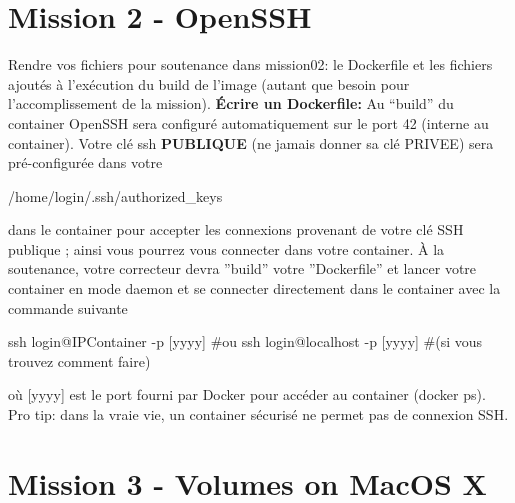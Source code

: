 \documentclass{42}
\begin{document}
\section{Mission 2 - OpenSSH}

Rendre vos fichiers pour soutenance dans mission02: le Dockerfile et les fichiers ajoutés à l’exécution du build de l’image (autant que besoin pour l’accomplissement de la mission).
\newline
\newline
\textbf{Écrire un Dockerfile:}
\newline
Au “build” du container OpenSSH sera configuré automatiquement sur le port 42 (interne au container).
\newline
\newline
Votre clé ssh \textbf{PUBLIQUE} (ne jamais donner sa clé PRIVEE) sera pré-configurée dans votre
\begin{42console}
/home/login/.ssh/authorized_keys
\end{42console}
dans le container pour accepter les connexions provenant de votre clé SSH publique ; ainsi vous pourrez vous connecter dans votre container.
\newline
\newline
À la soutenance, votre correcteur devra ''build'' votre ''Dockerfile'' et lancer votre container en mode daemon et se connecter directement dans le container avec la commande suivante
\begin{42console}
ssh login@IPContainer -p [yyyy] #ou
ssh login@localhost -p [yyyy] #(si vous trouvez comment faire)
\end{42console}
où [yyyy] est le port fourni par Docker pour accéder au container (docker ps).
\newline
\newline
\info
{
	Pro tip: dans la vraie vie, un container sécurisé ne permet pas de connexion SSH.
}

	\newpage

\section{Mission 3 - Volumes on MacOS X}
\end{document}
